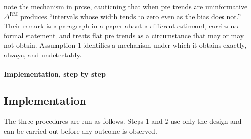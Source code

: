 \documentclass[12pt]{article}
\theoremstyle{definition}
\numberwithin{equation}{section}
\begin{document}
\citet{arora2026trading} note the mechanism in prose, cautioning that when
pre trends are uninformative $\Delta^{\mathrm{RM}}$ produces ``intervals whose
width tends to zero even as the bias does not.'' Their remark is a paragraph in
a paper about a different estimand, carries no formal statement, and treats flat
pre trends as a circumstance that may or may not obtain. Assumption
1 identifies a mechanism under which it obtains exactly, always, and
undetectably.

\paragraph{Implementation, step by step}

\subsection*{Implementation}

The three procedures are run as follows. Steps 1 and 2 use only the design and
can be carried out before any outcome is observed.
\end{document}
